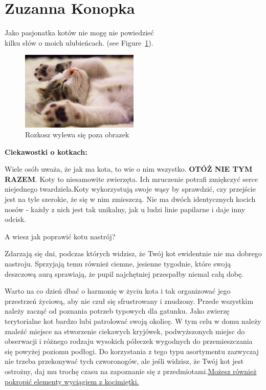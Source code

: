 \section{Zuzanna Konopka}
\label{sec:zuza}
\begin{flushleft}
Jako pasjonatka kotów nie mogę nie powiedzieć \\
kilku słów o moich ulubieńcach. (see Figure~\ref{fig:kotek}).

\begin{figure}[htbp] 
    \centering
    \includegraphics[width=0.5\textwidth]{pictures/kotek.jpg} 
    
    \caption{Rozkosz wylewa się poza obrazek}
    \label{fig:kotek}
\end{figure}

\textbf{{\Huge Ciekawostki o kotkach:}}

\vspace {0.60cm}
    
    Wiele osób uważa, że jak ma kota, to wie o nim wszystko.
    \textbf{OTÓŻ NIE TYM RAZEM}. Koty to niesamowite zwierzęta. Ich mruczenie potrafi zmiękczyć serce niejednego twardziela.Koty wykorzystują swoje wąsy by sprawdzić, czy przejście jest na tyle szerokie, że się w nim zmieszczą. Nie ma dwóch identycznych kocich nosów - każdy z nich jest tak unikalny, jak u ludzi linie papilarne i daje inny odcisk.
  
\vspace {0.50cm}
{{\huge A wiesz jak poprawić kotu nastrój?}}
\vspace {0.50cm}

    Zdarzają się dni, podczas których widzisz, że Twój kot ewidentnie nie ma dobrego nastroju. Sprzyjają temu również ciemne, jesienne tygodnie, które swoją deszczową aurą sprawiają, że pupil najchętniej przespałby niemal całą dobę.
    
\vspace {0.50cm}
    Warto na co dzień dbać o harmonię w życiu kota i tak organizować jego przestrzeń życiową, aby nie czuł się sfrustrowany i znudzony. Przede wszystkim należy zacząć od poznania potrzeb typowych dla gatunku. Jako zwierzę terytorialne kot bardzo lubi patrolować swoją okolicę. W tym celu w domu należy znaleźć miejsce na stworzenie ciekawych kryjówek, podwyższonych miejsc do obserwacji i różnego rodzaju wysokich półeczek wygodnych do przemieszczania się powyżej poziomu podłogi. Do korzystania z tego typu asortymentu zazwyczaj nie trzeba przekonywać tych czworonogów, ale jeśli widzisz, że Twój kot jest ostrożny, daj mu trochę czasu na zapoznanie się z przedmiotami.\underline {Możesz również pokropić elementy wyciągiem z kocimiętki.}
 

\end{flushleft}
